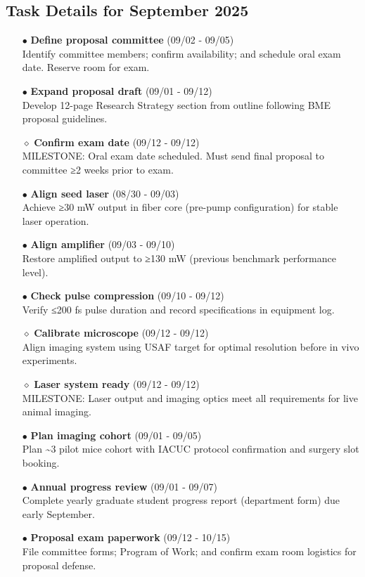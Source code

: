 \documentclass[landscape,a4paper]{article}
\begin{document}
\subsection{Task Details for September 2025}
\begin{itemize}[leftmargin=1cm]
    \item[\textcolor{researchcore}{$\bullet$}] \textbf{Define proposal committee} (09/02 - 09/05)\\ Identify committee members; confirm availability; and schedule oral exam date. Reserve room for exam.
    \item[\textcolor{researchcore}{$\bullet$}] \textbf{Expand proposal draft} (09/01 - 09/12)\\ Develop 12-page Research Strategy section from outline following BME proposal guidelines.
    \item[\textcolor{researchcore}{$\diamond$}] \textbf{Confirm exam date} (09/12 - 09/12)\\ MILESTONE: Oral exam date scheduled. Must send final proposal to committee ≥2 weeks prior to exam.
    \item[\textcolor{researchexp}{$\bullet$}] \textbf{Align seed laser} (08/30 - 09/03)\\ Achieve ≥30 mW output in fiber core (pre-pump configuration) for stable laser operation.
    \item[\textcolor{researchexp}{$\bullet$}] \textbf{Align amplifier} (09/03 - 09/10)\\ Restore amplified output to ≥130 mW (previous benchmark performance level).
    \item[\textcolor{researchexp}{$\bullet$}] \textbf{Check pulse compression} (09/10 - 09/12)\\ Verify ≤200 fs pulse duration and record specifications in equipment log.
    \item[\textcolor{researchexp}{$\diamond$}] \textbf{Calibrate microscope} (09/12 - 09/12)\\ Align imaging system using USAF target for optimal resolution before in vivo experiments.
    \item[\textcolor{researchexp}{$\diamond$}] \textbf{Laser system ready} (09/12 - 09/12)\\ MILESTONE: Laser output and imaging optics meet all requirements for live animal imaging.
    \item[\textcolor{other}{$\bullet$}] \textbf{Plan imaging cohort} (09/01 - 09/05)\\ Plan \textasciitilde{}3 pilot mice cohort with IACUC protocol confirmation and surgery slot booking.
    \item[\textcolor{other}{$\bullet$}] \textbf{Annual progress review} (09/01 - 09/07)\\ Complete yearly graduate student progress report (department form) due early September.
    \item[\textcolor{other}{$\bullet$}] \textbf{Proposal exam paperwork} (09/12 - 10/15)\\ File committee forms; Program of Work; and confirm exam room logistics for proposal defense.
\end{itemize}
\end{document}
